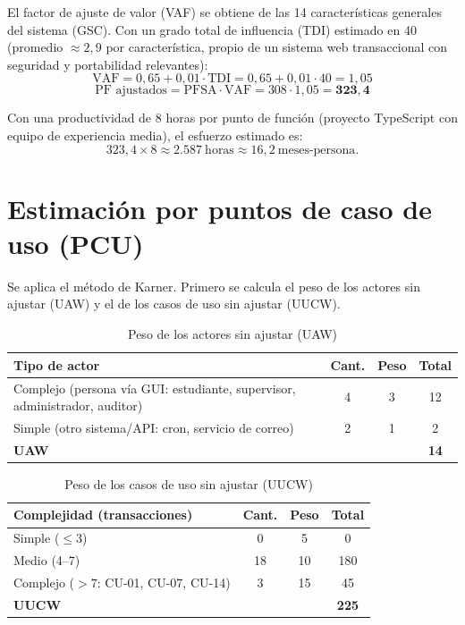 El factor de ajuste de valor (VAF) se obtiene de las 14 características generales del
sistema (GSC). Con un grado total de influencia (TDI) estimado en 40
(promedio $\approx 2{,}9$ por característica, propio de un sistema web transaccional con
seguridad y portabilidad relevantes):
\[
\text{VAF} = 0{,}65 + 0{,}01 \cdot \text{TDI} = 0{,}65 + 0{,}01 \cdot 40 = 1{,}05
\]
\[
\text{PF ajustados} = \text{PFSA} \cdot \text{VAF} = 308 \cdot 1{,}05 = \mathbf{323{,}4}
\]

Con una productividad de 8 horas por punto de función (proyecto TypeScript con equipo de
experiencia media), el esfuerzo estimado es:
\[
323{,}4 \times 8 \approx 2.587\ \text{horas} \approx 16{,}2\ \text{meses-persona}.
\]

\section{Estimación por puntos de caso de uso (PCU)}
Se aplica el método de Karner. Primero se calcula el peso de los actores sin ajustar
(UAW) y el de los casos de uso sin ajustar (UUCW).

\begin{table}[H]\centering
\caption{Peso de los actores sin ajustar (UAW)}\label{tab:uaw}
\begin{tabularx}{\textwidth}{X c c c}
\toprule
\textbf{Tipo de actor} & \textbf{Cant.} & \textbf{Peso} & \textbf{Total} \\
\midrule
Complejo (persona vía GUI: estudiante, supervisor, administrador, auditor) & 4 & 3 & 12 \\
Simple (otro sistema/API: cron, servicio de correo) & 2 & 1 & 2 \\
\midrule
\textbf{UAW} & & & \textbf{14} \\
\bottomrule
\end{tabularx}
\end{table}

\begin{table}[H]\centering
\caption{Peso de los casos de uso sin ajustar (UUCW)}\label{tab:uucw}
\begin{tabularx}{\textwidth}{X c c c}
\toprule
\textbf{Complejidad (transacciones)} & \textbf{Cant.} & \textbf{Peso} & \textbf{Total} \\
\midrule
Simple ($\leq 3$) & 0 & 5 & 0 \\
Medio (4--7) & 18 & 10 & 180 \\
Complejo ($>7$: CU-01, CU-07, CU-14) & 3 & 15 & 45 \\
\midrule
\textbf{UUCW} & & & \textbf{225} \\
\bottomrule
\end{tabularx}
\end{table}

